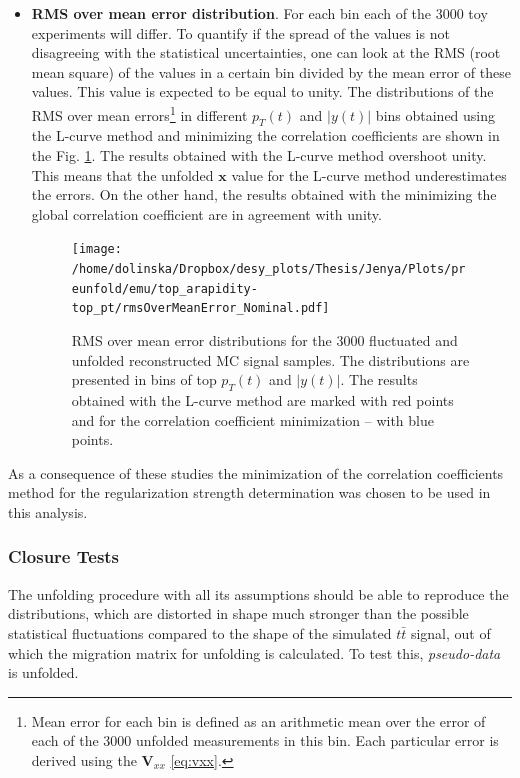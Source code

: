 \begin{itemize}
 \item \textbf{RMS over mean error distribution}. For each bin  each of the 3000 toy experiments will differ. To quantify if the spread of 
 the values is not disagreeing with the statistical uncertainties, one can look at the 
 RMS (root mean square) of the values in a certain bin divided by the mean error of these values. This value is expected to be equal to unity.
 The distributions of the RMS over mean errors\footnote{Mean error for each bin is defined as an arithmetic mean over the error of each of the 3000 
 unfolded measurements in this bin. Each particular error is derived using the $\mathbf{V}_{xx}$ \ref{eq:vxx}.} in different $p_{T}(t)$ 
 and $|y(t)|$ bins obtained using the L-curve method and minimizing the 
 correlation coefficients are shown in the Fig. \ref{fig:RMSovMeanErr}. The results obtained with the L-curve method
 overshoot unity. This means that the unfolded $\mathbf{x}$ value for the L-curve method underestimates the errors. On the other hand, 
 the results obtained with the minimizing the global correlation coefficient are in agreement with unity.
 \begin{figure}[t]
  \centering
  \texttt{[image: /home/dolinska/Dropbox/desy\_plots/Thesis/Jenya/Plots/preunfold/emu/top\_arapidity-top\_pt/rmsOverMeanError\_Nominal.pdf]}
  \caption{RMS over mean error distributions for the 3000 fluctuated and unfolded reconstructed MC signal samples. The distributions are
         presented in bins of top $p_{T}(t)$ and $|y(t)|$. The results obtained with the L-curve method are marked with red points and 
         for the correlation coefficient minimization -- with blue points.}
  \label{fig:RMSovMeanErr}
 \end{figure}

\end{itemize}

As a consequence of these studies the minimization of the correlation coefficients method for the regularization strength determination was chosen
to be used in this analysis.

\subsubsection{Closure Tests}\label{ssec:clT}

The unfolding procedure with all its assumptions should be able to reproduce the distributions, which are distorted in shape much stronger
than the possible statistical fluctuations compared to the shape of the simulated $t\bar{t}$ signal, out of which the migration matrix for unfolding
is calculated. To test this, \textit{pseudo-data} is unfolded.


